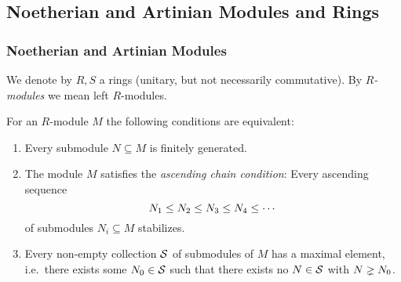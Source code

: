 \subsection{Noetherian and Artinian Modules and Rings}





\subsubsection{Noetherian and Artinian Modules}


\begin{conventions}
  We denote by $R, S$ a rings (unitary, but not necessarily commutative).
  By \emph{$R$-modules} we mean left $R$-modules.
\end{conventions}


\begin{lemma}
  \label{lemma: characterizations of noetherian}
  For an $R$-module $M$ the following conditions are equivalent:
  \begin{enumerate}
    \item
      Every submodule $N \subseteq M$ is finitely generated.
    \item
      The module $M$ satisfies the \emph{ascending chain condition}:
      Every ascending sequence
      \[
                    N_1
        \leq  N_2
        \leq  N_3
        \leq  N_4
        \leq  \dotsb
      \]
      of submodules $N_i \subseteq M$ stabilizes.
    \item
      Every non-empty collection $\mathcal{S}$ of submodules of $M$ has a maximal element, i.e.\ there exists some $N_0 \in \mathcal{S}$ such that there exists no $N \in \mathcal{S}$ with $N \gneq N_0$.
  \end{enumerate}
\end{lemma}


